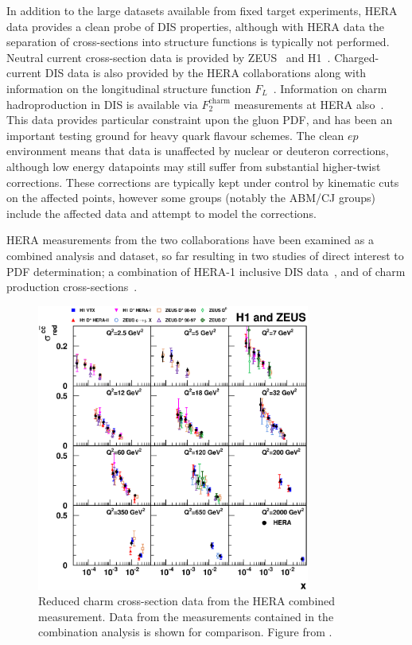 In addition to the large datasets available from fixed target experiments, HERA data provides a clean probe of DIS properties, although with HERA data the separation of cross-sections into structure functions is typically not performed. Neutral current cross-section data is provided by ZEUS~\cite{Breitweg:1998dz,Chekanov:2001qu,Chekanov:2002ej,Chekanov:2003yv} and H1~\cite{Adloff:2000qk,Adloff:2000qj,Adloff:2003uh}. Charged-current DIS data is also provided by the HERA collaborations \cite{Chekanov:2003vw,Adloff:2003uh} along with information on the longitudinal structure function $F_L$~\cite{Andreev:2013vha,Chekanov:2009na}. Information on charm hadroproduction in DIS is available via $F_2^{\mathrm{charm}}$ measurements at HERA also~\cite{Adloff:1996xq,Adloff:2001zj,Aktas:2005iw,Aktas:2004az,Breitweg:1999ad,Chekanov:2003rb,Chekanov:2007ch}. This data provides particular constraint upon the gluon PDF, and has been an important testing ground for heavy quark flavour schemes. The clean $ep$ environment means that data is unaffected by nuclear or deuteron corrections, although low energy datapoints may still suffer from substantial higher-twist corrections. These corrections are typically kept under control by kinematic cuts on the affected points, however some groups (notably the ABM/CJ groups) include the affected data and attempt to model the corrections.

HERA measurements from the two collaborations have been examined as a combined analysis and dataset, so far resulting in two studies of direct interest to PDF determination; a combination of HERA-1 inclusive DIS data~\cite{aaron:2009wt}, and of charm production cross-sections~\cite{Abramowicz:1900rp}.

\begin{figure}[ht]
\centering
\includegraphics[width=0.8\textwidth]{3-PDFdet/figs/d12-172f3.eps}
\caption[Combined reduced charm cross-section data from HERA]{Reduced charm cross-section data from the HERA combined measurement. Data from the measurements contained in the combination analysis is shown for comparison. Figure from \cite{Abramowicz:1900rp}.}
\label{fig:HERAF2c}
\end{figure}

